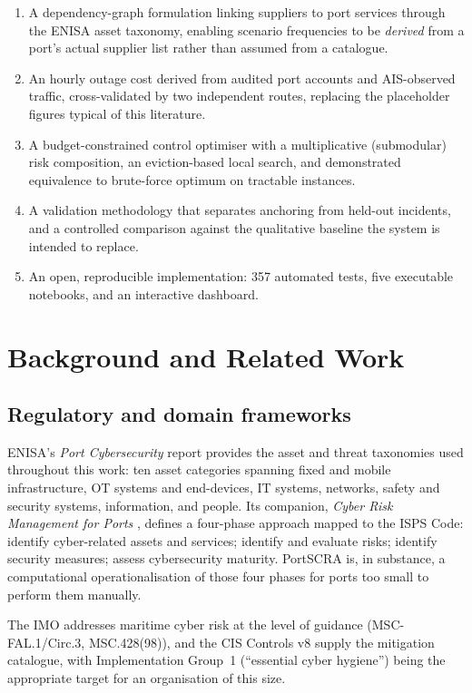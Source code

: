 \documentclass[conference]{IEEEtran}
\begin{document}
\begin{enumerate}
\item A dependency-graph formulation linking suppliers to port services through the
ENISA asset taxonomy, enabling scenario frequencies to be \emph{derived} from a
port's actual supplier list rather than assumed from a catalogue.
\item An hourly outage cost derived from audited port accounts and AIS-observed
traffic, cross-validated by two independent routes, replacing the placeholder
figures typical of this literature.
\item A budget-constrained control optimiser with a multiplicative (submodular)
risk composition, an eviction-based local search, and demonstrated equivalence to
brute-force optimum on tractable instances.
\item A validation methodology that separates anchoring from held-out incidents,
and a controlled comparison against the qualitative baseline the system is intended
to replace.
\item An open, reproducible implementation: 357 automated tests, five executable
notebooks, and an interactive dashboard.
\end{enumerate}

\section{Background and Related Work}

\subsection{Regulatory and domain frameworks}

ENISA's \emph{Port Cybersecurity} report \cite{enisa2019} provides the asset and
threat taxonomies used throughout this work: ten asset categories spanning fixed
and mobile infrastructure, OT systems and end-devices, IT systems, networks, safety
and security systems, information, and people. Its companion, \emph{Cyber Risk
Management for Ports} \cite{enisa2020}, defines a four-phase approach mapped to the
ISPS Code: identify cyber-related assets and services; identify and evaluate risks;
identify security measures; assess cybersecurity maturity. PortSCRA is, in
substance, a computational operationalisation of those four phases for ports too
small to perform them manually.

The IMO addresses maritime cyber risk at the level of guidance
(MSC-FAL.1/Circ.3, MSC.428(98)), and the CIS Controls v8 \cite{cis} supply the
mitigation catalogue, with Implementation Group~1 (``essential cyber hygiene'')
being the appropriate target for an organisation of this size.
\end{document}
